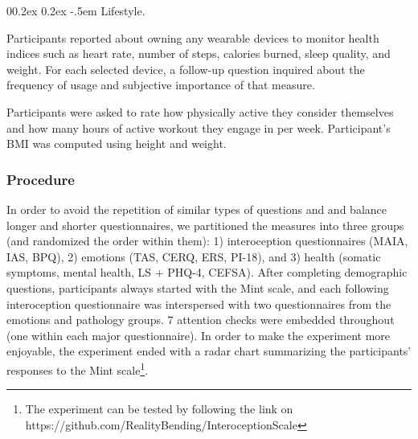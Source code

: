 \documentclass[
  jou,
  floatsintext,
  longtable,
  nolmodern,
  notxfonts,
  notimes,
  colorlinks=true,linkcolor=blue,citecolor=blue,urlcolor=blue]{apa7}
\makeatletter
\renewcommand{\paragraph}{\@startsection{paragraph}{4}{\parindent}%
	{0\baselineskip \@plus 0.2ex \@minus 0.2ex}%
	{-.5em}%
	{\normalfont\normalsize\bfseries\typesectitle}}
\makeatother
\begin{document}
\paragraph{Lifestyle.}\label{lifestyle}

Participants reported about owning any wearable devices to monitor
health indices such as heart rate, number of steps, calories burned,
sleep quality, and weight. For each selected device, a follow-up
question inquired about the frequency of usage and subjective importance
of that measure.

Participants were asked to rate how physically active they consider
themselves and how many hours of active workout they engage in per week.
Participant's BMI was computed using height and weight.

\subsubsection{Procedure}\label{procedure-1}

In order to avoid the repetition of similar types of questions and and
balance longer and shorter questionnaires, we partitioned the measures
into three groups (and randomized the order within them): 1)
interoception questionnaires (MAIA, IAS, BPQ), 2) emotions (TAS, CERQ,
ERS, PI-18), and 3) health (somatic symptoms, mental health, LS + PHQ-4,
CEFSA). After completing demographic questions, participants always
started with the Mint scale, and each following interoception
questionnaire was interspersed with two questionnaires from the emotions
and pathology groups. 7 attention checks were embedded throughout (one
within each major questionnaire). In order to make the experiment more
enjoyable, the experiment ended with a radar chart summarizing the
participants' responses to the Mint scale\footnote{The experiment can be
  tested by following the link on
  https://github.com/RealityBending/InteroceptionScale}.
\end{document}
